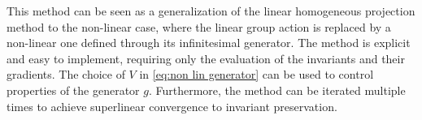 \documentclass[final,3p,times]{elsarticle}
\begin{document}
This method can be seen as a generalization of the linear homogeneous projection method to the non-linear case, where the linear group action is replaced by a non-linear one defined through its infinitesimal generator. The method is explicit and easy to implement, requiring only the evaluation of the invariants and their gradients. The choice of $V$ in \eqref{eq:non lin generator} can be used to control properties of the generator $g$. Furthermore, the method can be iterated multiple times to achieve superlinear convergence to invariant preservation.







\end{document}
